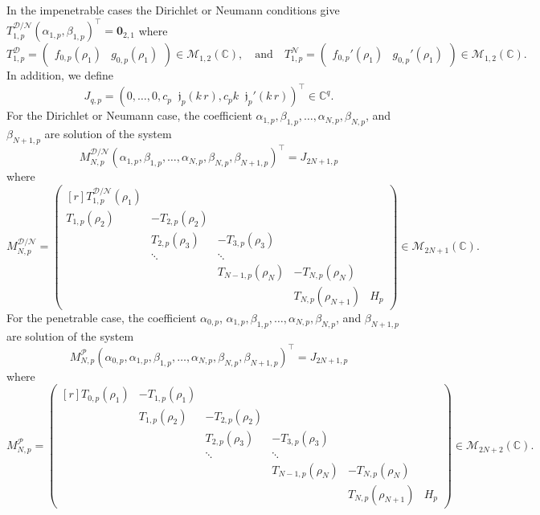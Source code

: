 \documentclass[12pt,a4paper]{article}
\theoremstyle{definition}
\theoremstyle{plain}
\theoremstyle{remark}
\newcommand{\bbC}{\mathbb{C}}
\newcommand{\calD}{\mathcal{D}}
\newcommand{\calM}{\mathcal{M}}
\newcommand{\calN}{\mathcal{N}}
\newcommand{\calP}{\mathcal{P}}
\newcommand{\frj}{\mathop{}\!\mathfrak{j}}
\newcommand{\vect}[1]{\boldsymbol{#1}}
\begin{document}
In the impenetrable cases the Dirichlet or Neumann conditions give $T_{1, p}^{\calD/\calN} (\alpha_{1, p}, \beta_{1, p})^\intercal = \vect{0}_{2, 1}$ where
\[
    T_{1, p}^\calD = \begin{pmatrix}
        f_{0, p}(\rho_1) & g_{0, p}(\rho_1)
    \end{pmatrix} \in \calM_{1, 2}(\bbC), \quad
    \text{and} \quad
    T_{1, p}^\calN = \begin{pmatrix}
        f_{0, p}'(\rho_1) & g_{0, p}'(\rho_1)
    \end{pmatrix} \in \calM_{1, 2}(\bbC).
\]
In addition, we define
\[
    J_{q, p} = (0, \ldots, 0, c_p\frj_p(k\, r), c_p k \frj_p'(k\, r))^\intercal \in \bbC^{q}.
\]
For the Dirichlet or Neumann case, the coefficient $\alpha_{1, p}, \beta_{1, p}, \ldots, \alpha_{N, p}, \beta_{N, p}$, and $\beta_{N+1, p}$ are solution of the system
\[
    M_{N, p}^{\calD/\calN} (\alpha_{1, p}, \beta_{1, p}, \ldots, \alpha_{N, p}, \beta_{N, p}, \beta_{N+1, p})^\intercal = J_{2N+1, p}
\]
where
\[
    M_{N, p}^{\calD/\calN} = \begin{pmatrix*}[r]
        T_{1, p}^{\calD/\calN}(\rho_1)\\
        T_{1, p}(\rho_2) & -T_{2, p}(\rho_2)\\
        & T_{2, p}(\rho_3) & -T_{3, p}(\rho_3)\\
        & \ddots & \ddots\\
        & & T_{N-1, p}(\rho_N) & -T_{N, p}(\rho_N)\\
        & & & T_{N, p}(\rho_{N+1}) & H_p
    \end{pmatrix*} \in \calM_{2N+1}(\bbC).
\]
For the penetrable case, the coefficient $\alpha_{0, p}$, $\alpha_{1, p}, \beta_{1, p}, \ldots, \alpha_{N, p}, \beta_{N, p}$, and $\beta_{N+1, p}$ are solution of the system
\[
    M_{N, p}^\calP (\alpha_{0, p}, \alpha_{1, p}, \beta_{1, p}, \ldots, \alpha_{N, p}, \beta_{N, p}, \beta_{N+1, p})^\intercal = J_{2N+1, p}
\]
where
\[
    M_{N, p}^\calP = \begin{pmatrix*}[r]
        T_{0, p}(\rho_1) & -T_{1, p}(\rho_1)\\
        & T_{1, p}(\rho_2) & -T_{2, p}(\rho_2)\\
        & & T_{2, p}(\rho_3) & -T_{3, p}(\rho_3)\\
        & & \ddots & \ddots\\
        & & & T_{N-1, p}(\rho_N) & -T_{N, p}(\rho_N)\\
        & & & & T_{N, p}(\rho_{N+1}) & H_p
    \end{pmatrix*} \in \calM_{2N+2}(\bbC).
\]
\end{document}
